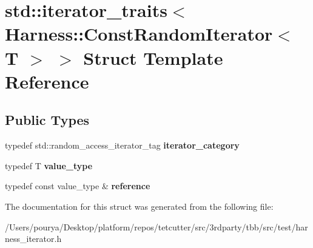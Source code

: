 \hypertarget{structstd_1_1iterator__traits_3_01Harness_1_1ConstRandomIterator_3_01T_01_4_01_4}{}\section{std\+:\+:iterator\+\_\+traits$<$ Harness\+:\+:Const\+Random\+Iterator$<$ T $>$ $>$ Struct Template Reference}
\label{structstd_1_1iterator__traits_3_01Harness_1_1ConstRandomIterator_3_01T_01_4_01_4}
\subsection*{Public Types}
\begin{DoxyCompactItemize}
\item 
\hypertarget{structstd_1_1iterator__traits_3_01Harness_1_1ConstRandomIterator_3_01T_01_4_01_4_a928c5953611eb7a3d903cab07a8fb6ce}{}typedef std\+::random\+\_\+access\+\_\+iterator\+\_\+tag {\bfseries iterator\+\_\+category}\label{structstd_1_1iterator__traits_3_01Harness_1_1ConstRandomIterator_3_01T_01_4_01_4_a928c5953611eb7a3d903cab07a8fb6ce}

\item 
\hypertarget{structstd_1_1iterator__traits_3_01Harness_1_1ConstRandomIterator_3_01T_01_4_01_4_ac75a2c10f9026193e213dd85710eb4e4}{}typedef T {\bfseries value\+\_\+type}\label{structstd_1_1iterator__traits_3_01Harness_1_1ConstRandomIterator_3_01T_01_4_01_4_ac75a2c10f9026193e213dd85710eb4e4}

\item 
\hypertarget{structstd_1_1iterator__traits_3_01Harness_1_1ConstRandomIterator_3_01T_01_4_01_4_a3c4a9a8efb32336c0af5ce345723662d}{}typedef const value\+\_\+type \& {\bfseries reference}\label{structstd_1_1iterator__traits_3_01Harness_1_1ConstRandomIterator_3_01T_01_4_01_4_a3c4a9a8efb32336c0af5ce345723662d}

\end{DoxyCompactItemize}


The documentation for this struct was generated from the following file\+:\begin{DoxyCompactItemize}
\item 
/\+Users/pourya/\+Desktop/platform/repos/tetcutter/src/3rdparty/tbb/src/test/harness\+\_\+iterator.\+h\end{DoxyCompactItemize}
